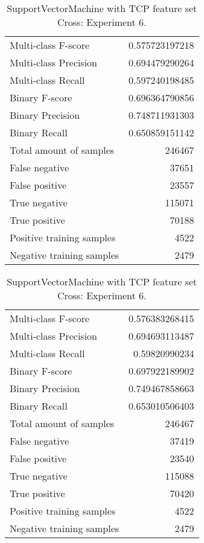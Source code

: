 \begin{table}[H]
\begin{minipage}{0.5\textwidth}
\caption{SupportVectorMachine with TCP feature set Cross: Experiment 5.}
\centering
\begin{tabular}{l r}
\toprule
Multi-class F-score & 0.575723197218 \\
Multi-class Precision & 0.694479290264 \\
Multi-class Recall & 0.597240198485 \\
\midrule
Binary F-score & 0.696364790856 \\
Binary Precision & 0.748711931303 \\
Binary Recall & 0.650859151142 \\
\midrule
Total amount of samples & 246467 \\
False negative & 37651 \\
False positive & 23557 \\
True negative & 115071 \\
True positive & 70188 \\
\midrule
Positive training samples & 4522 \\
Negative training samples & 2479 \\
\bottomrule
\end{tabular}
\end{minipage}
\hfillx
\begin{minipage}{0.5\textwidth}
\caption{SupportVectorMachine with TCP feature set Cross: Experiment 6.}
\centering
\begin{tabular}{l r}
\toprule
Multi-class F-score & 0.576383268415 \\
Multi-class Precision & 0.694693113487 \\
Multi-class Recall & 0.59820990234 \\
\midrule
Binary F-score & 0.697922189902 \\
Binary Precision & 0.749467858663 \\
Binary Recall & 0.653010506403 \\
\midrule
Total amount of samples & 246467 \\
False negative & 37419 \\
False positive & 23540 \\
True negative & 115088 \\
True positive & 70420 \\
\midrule
Positive training samples & 4522 \\
Negative training samples & 2479 \\
\bottomrule
\end{tabular}
\end{minipage}
\end{table}
